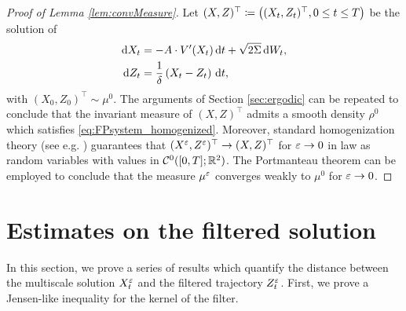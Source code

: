 \documentclass[10pt]{article}
\begin{document}
\begin{appendices}
\begin{proof}[Proof of Lemma \ref{lem:convMeasure}] Let $(X, Z)^\top \coloneqq \left((X_t, Z_t)^\top, 0\leq t \leq T\right)$ be the solution of
	\begin{equation}
	\label{eq:systemSDEHom}
	\begin{aligned}
	\mathrm{d} X_t &= -A \cdot V'(X_t) \,\mathrm{d} t + \sqrt{2\Sigma} \,\mathrm{d} W_t, \\
	\mathrm{d} Z_t &= \frac{1}{\delta} \left ( X_t - Z_t \right ) \,\mathrm{d} t,
	\end{aligned}
	\end{equation} 
	with $(X_0, Z_0)^\top \sim \mu^0$. The arguments of Section \ref{sec:ergodic} can be repeated to conclude that the invariant measure of $(X, Z)^\top$ admits a smooth density $\rho^0$ which satisfies \eqref{eq:FPsystem_homogenized}. Moreover, standard homogenization theory (see e.g. \cite[Chapter 3]{BLP78}) guarantees that $(X^\varepsilon,Z^\varepsilon)^\top \to (X,Z)^\top$ for $\varepsilon \to 0$ in law as random variables with values in $\mathcal C^0([0, T]; \mathbb{R}^2)$. The Portmanteau theorem can be employed to conclude that the measure $\mu^\varepsilon$ converges weakly to $\mu^0$ for $\varepsilon \to 0$.
\end{proof}

\section{Estimates on the filtered solution}

In this section, we prove a series of results which quantify the distance between the multiscale solution $X_t^\varepsilon$ and the filtered trajectory $Z_t^\varepsilon$. First, we prove a Jensen-like inequality for the kernel of the filter.


\end{appendices}
\end{document}
